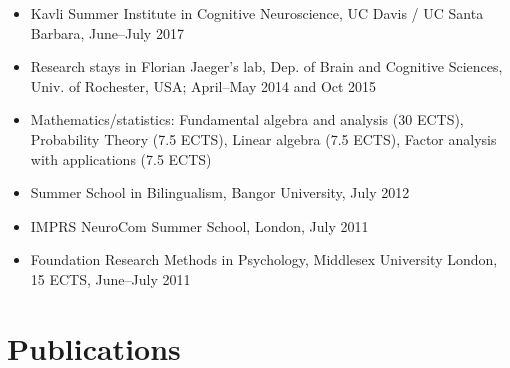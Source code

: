 \documentclass[margin, 11pt]{res} %
\begin{document}
\begin{resume}
\begin{itemize}
\item Kavli Summer Institute in Cognitive Neuroscience, UC Davis / UC Santa Barbara, June--July 2017

\item Research stays in Florian Jaeger's lab, Dep. of Brain and Cognitive Sciences, Univ. of Rochester, USA; April--May 2014 and Oct 2015

\item Mathematics/statistics: 
Fundamental algebra and analysis (30 ECTS), Probability Theory (7.5 ECTS), Linear algebra (7.5 ECTS), Factor analysis with applications (7.5 ECTS)

\item Summer School in Bilingualism, Bangor University, July 2012
 
\item IMPRS NeuroCom Summer School, London, July 2011 

\item Foundation Research Methods in Psychology, Middlesex University London, 15 ECTS, June--July 2011

\end{itemize}








\section{\sc Publications}


\end{resume}
\end{document}
